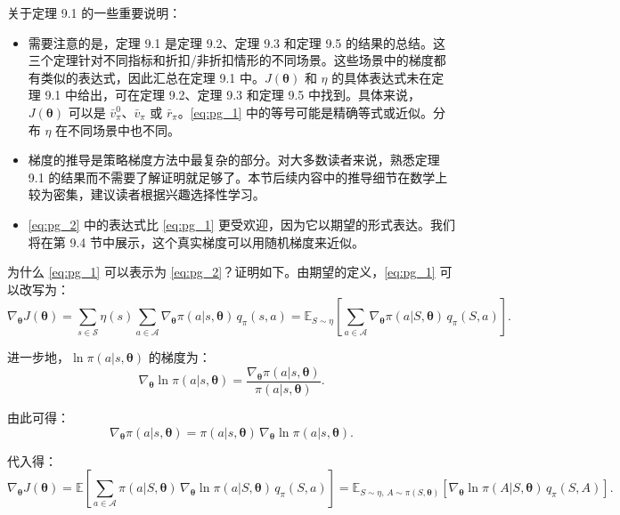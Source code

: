\documentclass[UTF8]{article}
\begin{document}
\begin{remarkbox}
关于定理 9.1 的一些重要说明：
\begin{itemize}
    \item 需要注意的是，定理 9.1 是定理 9.2、定理 9.3 和定理 9.5 的结果的总结。这三个定理针对不同指标和折扣/非折扣情形的不同场景。这些场景中的梯度都有类似的表达式，因此汇总在定理 9.1 中。$J(\boldsymbol{\theta})$ 和 $\eta$ 的具体表达式未在定理 9.1 中给出，可在定理 9.2、定理 9.3 和定理 9.5 中找到。具体来说，$J(\boldsymbol{\theta})$ 可以是 $\bar{v}_\pi^0$、$\bar{v}_\pi$ 或 $\bar{r}_\pi$。\eqref{eq:pg_1} 中的等号可能是精确等式或近似。分布 $\eta$ 在不同场景中也不同。
    \item 梯度的推导是策略梯度方法中最复杂的部分。对大多数读者来说，熟悉定理 9.1 的结果而不需要了解证明就足够了。本节后续内容中的推导细节在数学上较为密集，建议读者根据兴趣选择性学习。
    \item \eqref{eq:pg_2} 中的表达式比 \eqref{eq:pg_1} 更受欢迎，因为它以期望的形式表达。我们将在第 9.4 节中展示，这个真实梯度可以用随机梯度来近似。
\end{itemize}
\end{remarkbox}

为什么 \eqref{eq:pg_1} 可以表示为 \eqref{eq:pg_2}？证明如下。由期望的定义，\eqref{eq:pg_1} 可以改写为：
\[
\nabla_{\boldsymbol{\theta}} J(\boldsymbol{\theta}) = \sum_{s \in \mathcal{S}} \eta(s) \sum_{a \in \mathcal{A}} \nabla_{\boldsymbol{\theta}} \pi(a|s, \boldsymbol{\theta}) \, q_\pi(s,a)
= \mathbb{E}_{S \sim \eta} \left[ \sum_{a \in \mathcal{A}} \nabla_{\boldsymbol{\theta}} \pi(a|S, \boldsymbol{\theta}) \, q_\pi(S,a) \right].
\]

进一步地，$\ln \pi(a|s, \boldsymbol{\theta})$ 的梯度为：
\[
\nabla_{\boldsymbol{\theta}} \ln \pi(a|s, \boldsymbol{\theta}) = \frac{\nabla_{\boldsymbol{\theta}} \pi(a|s, \boldsymbol{\theta})}{\pi(a|s, \boldsymbol{\theta})}.
\]

由此可得：
\[
\nabla_{\boldsymbol{\theta}} \pi(a|s, \boldsymbol{\theta}) = \pi(a|s, \boldsymbol{\theta}) \, \nabla_{\boldsymbol{\theta}} \ln \pi(a|s, \boldsymbol{\theta}).
\]

代入得：
\[
\nabla_{\boldsymbol{\theta}} J(\boldsymbol{\theta}) = \mathbb{E}\left[ \sum_{a \in \mathcal{A}} \pi(a|S, \boldsymbol{\theta}) \, \nabla_{\boldsymbol{\theta}} \ln \pi(a|S, \boldsymbol{\theta}) \, q_\pi(S, a) \right]
= \mathbb{E}_{S \sim \eta, \, A \sim \pi(S,\boldsymbol{\theta})} \left[ \nabla_{\boldsymbol{\theta}} \ln \pi(A|S, \boldsymbol{\theta}) \, q_\pi(S, A) \right].
\]
\end{document}
